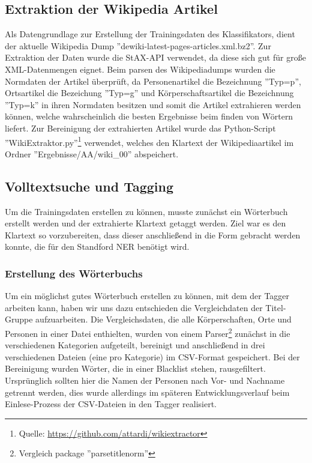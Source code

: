 \documentclass[a4paper]{article}
\begin{document}
	\subsection{Extraktion der Wikipedia Artikel}
		Als Datengrundlage zur Erstellung der Trainingsdaten des Klassifikators, dient der aktuelle Wikipedia Dump ''dewiki-latest-pages-articles.xml.bz2''. 
		Zur Extraktion der Daten wurde die StAX-API verwendet, da diese sich gut für große XML-Datenmengen eignet. 
		Beim parsen des Wikipediadumps wurden die Normdaten der Artikel überprüft, da Personenartikel die Bezeichnung ''Typ=p'', Ortsartikel die Bezeichung ''Typ=g'' und Körperschaftsartikel die Bezeichnung ''Typ=k'' in ihren Normdaten besitzen und somit die Artikel extrahieren werden können, welche wahrscheinlich die besten Ergebnisse beim finden von Wörtern liefert. 
		Zur Bereinigung der extrahierten Artikel wurde das Python-Script ''WikiExtraktor.py''\footnote{Quelle: \url{https://github.com/attardi/wikiextractor}} verwendet, welches den Klartext der Wikipediaartikel im Ordner ''Ergebnisse/AA/wiki\_00'' abspeichert.
		
	\subsection{Volltextsuche und Tagging}
		Um die Trainingsdaten erstellen zu können, musste zunächst ein Wörterbuch erstellt werden und der extrahierte Klartext getaggt werden.
		Ziel war es den Klartext so vorzubereiten, dass dieser anschließend in die Form gebracht werden konnte, die für den Standford NER benötigt wird.

		\subsubsection{Erstellung des Wörterbuchs}
			Um ein möglichst gutes Wörterbuch erstellen zu können, mit dem der Tagger arbeiten kann, haben wir uns dazu entschieden die Vergleichdaten der Titel-Gruppe aufzuarbeiten.
			Die Vergleichsdaten, die alle Körperschaften, Orte und Personen in einer Datei enthielten, wurden von einem Parser\footnote{Vergleich package ''parsetitlenorm''} zunächst in die verschiedenen Kategorien aufgeteilt, bereinigt und anschließend in drei verschiedenen Dateien (eine pro Kategorie) im CSV-Format gespeichert. 
			Bei der Bereinigung wurden Wörter, die in einer Blacklist stehen, rausgefiltert. 
			Ursprünglich sollten hier die Namen der Personen nach Vor- und Nachname getrennt werden, dies wurde allerdings im späteren Entwicklungsverlauf beim Einlese-Prozess der CSV-Dateien in den Tagger realisiert.
\end{document}

